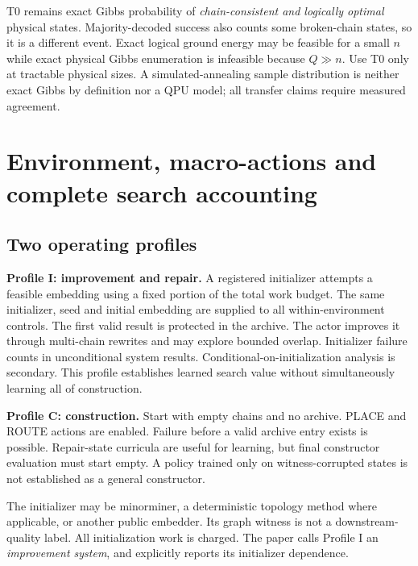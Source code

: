 \documentclass[11pt,a4paper]{article}
\theoremstyle{definition}\newtheorem{definition}[proposition]{Definition}
\begin{document}
T0 remains exact Gibbs probability of \emph{chain-consistent and logically optimal} physical states. Majority-decoded success also counts some broken-chain states, so it is a different event. Exact logical ground energy may be feasible for a small $n$ while exact physical Gibbs enumeration is infeasible because $Q\gg n$. Use T0 only at tractable physical sizes. A simulated-annealing sample distribution is neither exact Gibbs by definition nor a QPU model; all transfer claims require measured agreement.
 \section{Environment, macro-actions and complete search accounting}\label{sec:system}
\subsection{Two operating profiles}
\textbf{Profile I: improvement and repair.} A registered initializer attempts a feasible embedding using a fixed portion of the total work budget. The same initializer, seed and initial embedding are supplied to all within-environment controls. The first valid result is protected in the archive. The actor improves it through multi-chain rewrites and may explore bounded overlap. Initializer failure counts in unconditional system results. Conditional-on-initialization analysis is secondary. This profile establishes learned search value without simultaneously learning all of construction.

\textbf{Profile C: construction.} Start with empty chains and no archive. PLACE and ROUTE actions are enabled. Failure before a valid archive entry exists is possible. Repair-state curricula are useful for learning, but final constructor evaluation must start empty. A policy trained only on witness-corrupted states is not established as a general constructor.

The initializer may be minorminer, a deterministic topology method where applicable, or another public embedder. Its graph witness is not a downstream-quality label. All initialization work is charged. The paper calls Profile I an \emph{improvement system}, and explicitly reports its initializer dependence.
\end{document}
